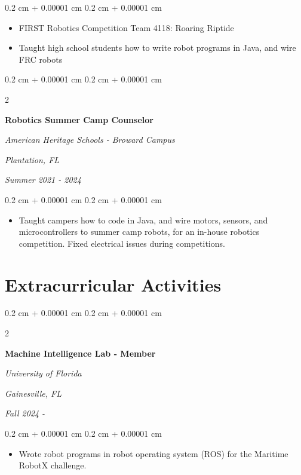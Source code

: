 \documentclass[10pt, letterpaper]{article}
\newenvironment{highlights}{
    \begin{itemize}[
        topsep=0.10 cm,
        parsep=0.10 cm,
        partopsep=0pt,
        itemsep=0pt,
        leftmargin=0.4 cm + 10pt
    ]
}{
    \end{itemize}
} %
\newenvironment{onecolentry}{
    \begin{adjustwidth}{
        0.2 cm + 0.00001 cm
    }{
        0.2 cm + 0.00001 cm
    }
}{
    \end{adjustwidth}
} %
\newenvironment{twocolentry}[2][]{
    \onecolentry
    \def\secondColumn{#2}
    \setcolumnwidth{\fill, 4.5 cm}
    \begin{paracol}{2}
}{
    \switchcolumn \raggedleft \secondColumn
    \end{paracol}
    \endonecolentry
} %
\begin{document}
        \vspace{0.10 cm}
        \begin{onecolentry}
            \begin{highlights}
                \item FIRST Robotics Competition Team 4118: Roaring Riptide 
                \item Taught high school students how to write robot programs in Java, and wire FRC robots 
            \end{highlights}
        \end{onecolentry}


        \vspace{0.2 cm}

        \begin{twocolentry}{
        \textit{Plantation, FL}    
            
        \textit{Summer 2021 - 2024}}
            \textbf{Robotics Summer Camp Counselor}
            
            \textit{American Heritage Schools - Broward Campus}
        \end{twocolentry}

        \vspace{0.10 cm}
        \begin{onecolentry}
            \begin{highlights}
                \item Taught campers how to code in Java, and wire motors, sensors, and microcontrollers to summer camp robots, for an in-house robotics competition. Fixed electrical issues during competitions. 
            \end{highlights}
        \end{onecolentry}


    \section{Extracurricular Activities}

        
        \begin{twocolentry}{
        \textit{Gainesville, FL}    
            
        \textit{Fall 2024 -}}
            \textbf{Machine Intelligence Lab - Member}
            
            \textit{University of Florida}
        \end{twocolentry}

        \vspace{0.10 cm}
        \begin{onecolentry}
            \begin{highlights}
                \item Wrote robot programs in robot operating system (ROS) for the Maritime RobotX challenge. 
            \end{highlights}
        \end{onecolentry}
\end{document}
